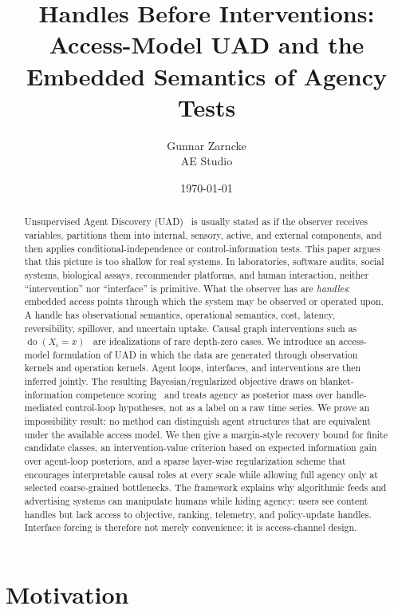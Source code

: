 \documentclass[11pt]{article}
\title{\bfseries Handles Before Interventions:\\
Access-Model UAD and the Embedded Semantics of Agency Tests}
\author{Gunnar Zarncke\\AE Studio}
\date{\today}
\newcommand{\doop}{\operatorname{do}}
\begin{document}
\maketitle

\begin{abstract}
Unsupervised Agent Discovery (UAD)~\cite{uad2025} is usually stated as if the observer receives
variables, partitions them into internal, sensory, active, and external components,
and then applies conditional-independence or control-information tests. This
paper argues that this picture is too shallow for real systems. In laboratories,
software audits, social systems, biological assays, recommender platforms, and
human interaction, neither ``intervention'' nor ``interface'' is primitive. What
the observer has are \emph{handles}: embedded access points through which the
system may be observed or operated upon. A handle has observational semantics,
operational semantics, cost, latency, reversibility, spillover, and uncertain
uptake. Causal graph interventions such as $\doop(X_i=x)$~\cite{pearl2009causality} are idealizations of
rare depth-zero cases. We introduce an access-model formulation of UAD in which
the data are generated through observation kernels and operation kernels. Agent
loops, interfaces, and interventions are then inferred jointly. The resulting
Bayesian/regularized objective draws on blanket-information competence scoring~\cite{biq2025}
and treats agency as posterior mass over handle-mediated
control-loop hypotheses, not as a label on a raw time series. We prove an
impossibility result: no method can distinguish agent structures that are
equivalent under the available access model. We then give a margin-style recovery
bound for finite candidate classes, an intervention-value criterion based on
expected information gain over agent-loop posteriors, and a sparse layer-wise
regularization scheme that encourages interpretable causal roles at every scale
while allowing full agency only at selected coarse-grained bottlenecks. The
framework explains why algorithmic feeds and advertising systems can manipulate
humans while hiding agency: users see content handles but lack access to objective,
ranking, telemetry, and policy-update handles. Interface forcing is therefore
not merely convenience; it is access-channel design.
\end{abstract}

\section{Motivation}
\end{document}
